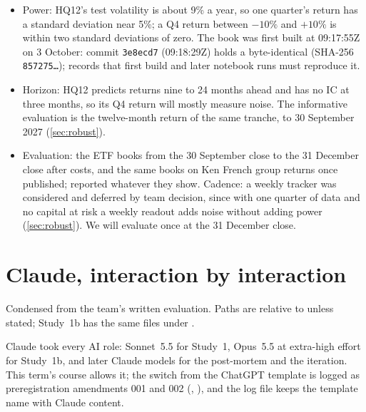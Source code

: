 \documentclass[11pt,letterpaper]{article}
\begin{document}
\begin{itemize}
  \item Power: HQ12's test volatility is about 9\% a year, so one quarter's return has a standard deviation near 5\%; a Q4 return between $-10\%$ and $+10\%$ is within two standard deviations of zero. %
  The book was first built at 09:17:55Z on 3 October: commit \texttt{3e8ecd7} (09:18:29Z) holds a byte-identical  (SHA-256 \texttt{857275\ldots});  records that first build and later notebook runs must reproduce it. %
  \item Horizon: HQ12 predicts returns nine to 24 months ahead and has no IC at three months, so its Q4 return will mostly measure noise. The informative evaluation is the twelve-month return of the same tranche, to 30 September 2027 (\cref{sec:robust}).
  \item Evaluation: the ETF books from the 30 September close to the 31 December close after costs, and the same books on Ken French group returns once published; reported whatever they show. Cadence: a weekly tracker was considered and deferred by team decision, since with one quarter of data and no capital at risk a weekly readout adds noise without adding power (\cref{sec:robust}). We will evaluate once at the 31 December close.
\end{itemize}

\section{Claude, interaction by interaction}\label{app:claude}
Condensed from the team's written evaluation. Paths are relative to 
unless stated; Study~1b has the same files under
.

Claude took every AI role: Sonnet~5.5 for Study~1, Opus~5.5 at extra-high
effort for Study~1b, and later Claude models for the post-mortem and the
iteration. This term's course allows it; the switch from the ChatGPT template is
logged as preregistration amendments 001 and 002
(, ), and the log
file keeps the template name  with Claude content. %
\end{document}
